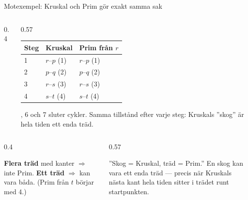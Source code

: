 \begin{frame}{Motexempel: Kruskal och Prim gör exakt samma sak}
\begin{columns}[T]
\begin{column}{0.4\textwidth}
\centering

\end{column}
\begin{column}{0.57\textwidth}
\footnotesize
\renewcommand{\arraystretch}{1.12}
\begin{tabular}{@{}lll@{}}
\toprule
Steg & Kruskal & Prim från $r$\\
\midrule
1 & $r$--$p$ (1) & $r$--$p$ (1)\\
2 & $p$--$q$ (2) & $p$--$q$ (2)\\
3 & $r$--$s$ (3) & $r$--$s$ (3)\\
4 & $s$--$t$ (4) & $s$--$t$ (4)\\
\bottomrule
\end{tabular}\par{}, 6 och 7 sluter cykler. Samma tillstånd efter varje steg: Kruskals ”skog” är hela tiden
ett enda träd.
\end{column}
\end{columns}
\vfill
\begin{columns}[T]
\begin{column}{0.4\textwidth}
\begin{ahabox}[fontupper=\footnotesize]
\textbf{Flera träd} med kanter $\Rightarrow$ inte Prim. \textbf{Ett träd} $\Rightarrow$ kan vara
båda. (Prim från $t$ börjar med 4.)
\end{ahabox}
\end{column}
\begin{column}{0.57\textwidth}
\begin{missbox}[fontupper=\footnotesize]
”Skog = Kruskal, träd = Prim.” En skog kan vara ett enda träd — precis när Kruskals nästa kant
hela tiden sitter i trädet runt startpunkten.
\end{missbox}
\end{column}
\end{columns}
\end{frame}
